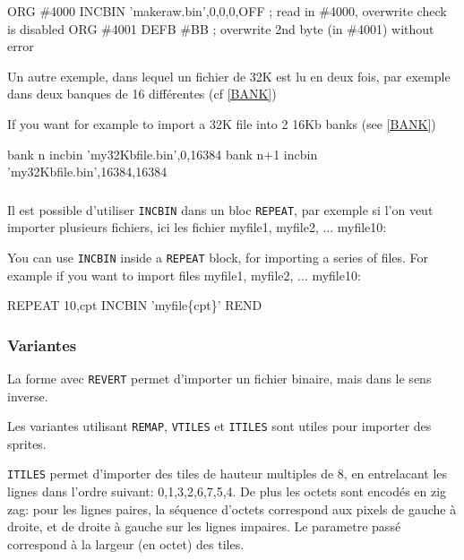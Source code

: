 \begin{code}
ORG \#4000
INCBIN 'makeraw.bin',0,0,0,OFF  ; read in \#4000, overwrite check is disabled
\medskip
ORG \#4001
DEFB \#BB ; overwrite 2nd byte (in \#4001) without error
\end{code}

\begin{xfr}
Un autre exemple, dans lequel un fichier de 32K est lu en deux fois, par exemple dans deux banques de 16 différentes (cf \ref{BANK})
\end{xfr}
\begin{xen}
If you want for example to import a 32K file into 2 16Kb banks (see \ref{BANK})
\end{xen}

\begin{code}
bank n
incbin 'my32Kbfile.bin',0,16384
bank n+1
incbin 'my32Kbfile.bin',16384,16384
\end{code}

\subsubsection{}

\begin{xfr}
Il est possible d'utiliser \texttt{INCBIN} dans un bloc \texttt{REPEAT}, par exemple si l'on veut importer plusieurs fichiers, ici les fichier myfile1, myfile2, ... myfile10:
\end{xfr}
\begin{xen}
You can use \texttt{INCBIN} inside a \texttt{REPEAT} block, for importing a series of files. For example if you want to import  files myfile1, myfile2, ... myfile10:
\end{xen}

\begin{code}
REPEAT 10,cpt
 INCBIN 'myfile\{cpt\}'
REND
\end{code}

\begin{xfr}
\subsubsection{Variantes}

La forme avec \texttt{REVERT} permet d'importer un fichier binaire, mais dans le sens inverse.

Les variantes utilisant \texttt{REMAP}, \texttt{VTILES}  et \texttt{ITILES} sont utiles pour importer des sprites.

\texttt{ITILES} permet d'importer des tiles de hauteur multiples de 8, en entrelacant les lignes dans l'ordre suivant: 0,1,3,2,6,7,5,4.
De plus les octets sont encodés en zig zag: pour les lignes paires, la séquence d'octets correspond aux pixels de gauche à droite,
et de droite à gauche sur les lignes impaires. Le parametre passé correspond à la largeur (en octet) des tiles.
\end{xfr}

